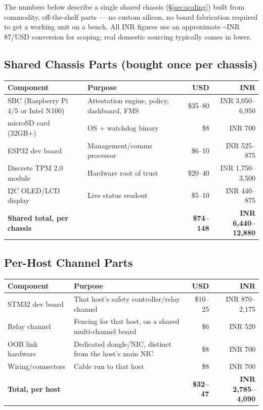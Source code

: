 \documentclass[11pt,a4paper]{article}
\begin{document}
The numbers below describe a single shared chassis (\S\ref{sec:scaling})
built from commodity, off-the-shelf parts --- no custom silicon, no
board fabrication required to get a working unit on a bench. All INR
figures use an approximate \textasciitilde INR 87/USD conversion for
scoping; real domestic sourcing typically comes in lower.

\subsection{Shared Chassis Parts (bought once per chassis)}

\begin{center}
\renewcommand{\arraystretch}{1.3}
\small
\begin{tabular}{@{}p{4.6cm}p{5.2cm}rr@{}}
\toprule
\textbf{Component} & \textbf{Purpose} & \textbf{USD} & \textbf{INR} \\
\midrule
SBC (Raspberry Pi 4/5 or Intel N100) & Attestation engine, policy, dashboard, FMS & \$35--80 & INR 3,050--6,950 \\
microSD card (32GB+) & OS + watchdog binary & \$8 & INR 700 \\
ESP32 dev board & Management/comms processor & \$6--10 & INR 525--875 \\
Discrete TPM 2.0 module & Hardware root of trust & \$20--40 & INR 1,750--3,500 \\
I2C OLED/LCD display & Live status readout & \$5--10 & INR 440--875 \\
\midrule
\textbf{Shared total, per chassis} & & \textbf{\$74--148} & \textbf{INR 6,440--12,880} \\
\bottomrule
\end{tabular}
\end{center}

\subsection{Per-Host Channel Parts}

\begin{center}
\renewcommand{\arraystretch}{1.3}
\small
\begin{tabular}{@{}p{4.6cm}p{5.2cm}rr@{}}
\toprule
\textbf{Component} & \textbf{Purpose} & \textbf{USD} & \textbf{INR} \\
\midrule
STM32 dev board & That host's safety controller/relay channel & \$10--25 & INR 870--2,175 \\
Relay channel & Fencing for that host, on a shared multi-channel board & \$6 & INR 520 \\
OOB link hardware & Dedicated dongle/NIC, distinct from the host's main NIC & \$8 & INR 700 \\
Wiring/connectors & Cable run to that host & \$8 & INR 700 \\
\midrule
\textbf{Total, per host} & & \textbf{\$32--47} & \textbf{INR 2,785--4,090} \\
\bottomrule
\end{tabular}
\end{center}
\end{document}
